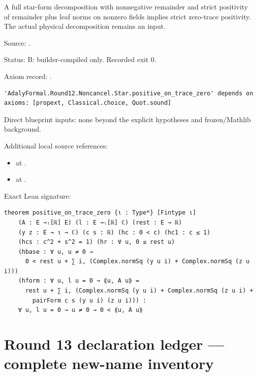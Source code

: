 \begin{theorem}[bp-340]
\label{bp-340}
\uses{}
\leanok
A full star-form decomposition with nonnegative remainder and strict positivity of remainder plus leaf norms on nonzero fields implies strict zero-trace positivity. The actual physical decomposition remains an input.

\par Source: \texttt{}.
\par Status: B: builder-compiled only. Recorded exit 0.
\par Axiom record: \texttt{}.
\begin{verbatim}
'AdalyFormal.Round12.Noncancel.Star.positive_on_trace_zero' depends on axioms: [propext, Classical.choice, Quot.sound]
\end{verbatim}
\par Direct blueprint inputs: none beyond the explicit hypotheses and frozen/Mathlib background.
\par Additional local source references:
\begin{itemize}
\item \texttt{} at \texttt{}.
\item \texttt{} at \texttt{}.
\end{itemize}
\par Exact Lean signature:
\begin{verbatim}
theorem positive_on_trace_zero {ι : Type*} [Fintype ι]
    (A : E →ₗ[ℝ] E) (l : E →ₗ[ℝ] ℂ) (rest : E → ℝ)
    (y z : E → ι → ℂ) (c s : ℝ) (hc : 0 < c) (hc1 : c ≤ 1)
    (hcs : c^2 + s^2 = 1) (hr : ∀ u, 0 ≤ rest u)
    (hbase : ∀ u, u ≠ 0 →
      0 < rest u + ∑ i, (Complex.normSq (y u i) + Complex.normSq (z u i)))
    (hform : ∀ u, l u = 0 → ⟪u, A u⟫ =
      rest u + ∑ i, (Complex.normSq (y u i) + Complex.normSq (z u i) +
        pairForm c s (y u i) (z u i))) :
    ∀ u, l u = 0 → u ≠ 0 → 0 < ⟪u, A u⟫
\end{verbatim}
\end{theorem}
\section{Round 13 declaration ledger — complete new-name inventory}

